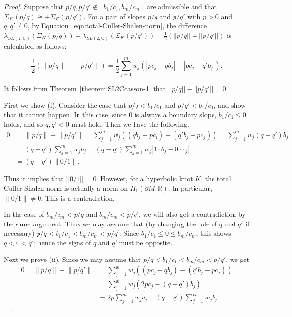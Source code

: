 \documentclass{amsart}
\theoremstyle{remark}
\theoremstyle{definition}
\begin{document}
\begin{proof}
Suppose that $p/q, p/q' \not\in [ b_1 / c_1 , b_m / c_m ]$ are admissible and that  $\Sigma_K (p/q) \cong \pm \Sigma_K (p/q')$. 
For a pair of slopes $p/q$ and $p/q'$ with $p > 0$ and $q, q' \neq 0$, by Equation~\eqref{eqn:total-Culler-Shalen-norm}, the difference $\lambda_{SL(2,\mathbb{C})} (\Sigma_K(p/q) ) - \lambda_{SL(2,\mathbb{C})} (\Sigma_K(p/q') ) = \frac{1}{2}\left(||p/q||-||p/q'||\right)$ is calculated as follows: 

\begin{equation}\label{eq1}
\frac{1}{2} \left( \left\| p/q \right\| - \left\| p /q'  \right\| \right) 
=\frac{1}{2} \sum_{j=1}^{m} w_j \left( \left| p c_j - q b_j \right| - \left| p c_j -  q' b_j \right| \right) .
\end{equation}

It follows from Theorem~\ref{theorem:SL2Ccasson-1} that $||p/q||-|| p/q'||=0$. 

First we show (i). 
Consider the case that $p/q < b_1 / c_1$ and $p/q' < b_1 / c_1$, and show that it cannot happen. 
In this case, since $0$ is always a boundary slope, $b_1 / c_1\leq 0$ holds, and so $q,q'<0$ must hold. 
Then we have the following. 
\begin{align*}
0 &= \left\| p/q \right\| - \left\| p/q' \right\| =\sum_{j=1}^{m} w_j ( ( q b_j - p c_j ) - ( q' b_j - p c_j ) )=\sum_{j=1}^{m} w_j ( q - q' ) b_j \\
&=(q-q')  \sum_{j=1}^{m} w_j b_j =(q-q')  \sum_{j=1}^{m}w_j|1 \cdot b_j- 0 \cdot c_j|\\
& = (q-q') \left\| 0/1 \right\|. 
\end{align*}

Thus it implies that $||0/1||=0$. 
However, for a hyperbolic knot $K$, the total Culler-Shalen norm is actually a norm on $H_1 (\partial M ; \mathbb{R})$. 
In particular, $\| 0/1 \| \ne 0$. This is a contradiction. 

In the case of $b_m / c_m < p/q$ and $b_m /c_m < p/q'$, we will also get a contradiction by the same argument. 
Thus we may assume that (by changing the role of $q$ and $q'$ if necessary) $p/q < b_1 / c_1 < b_m / c_m < p/q'$. 
Since $b_1 / c_1 \leq 0 \leq  b_m / c_m$, this shows $q<0<q'$; hence the signs of $q$ and $q'$ must be opposite. 

Next we prove (ii). 
Since we may assume that $p/q < b_1 / c_1 < b_m / c_m < p/q'$, we get
\begin{align*}
0=  \left\| p/q \right\| - \left\| p/q' \right\| 
&=\sum_{j=1}^{m}w_j ( ( p c_j  - q b_j ) - ( q' b_j - p c_j ) )\\
&=\sum_{j=1}^{m} w_j (  2 p c_j - ( q + q' ) b_j ) \\
&= 2p\sum_{j=1}^{m}w_j c_j   -(q + q')\sum_{j=1}^{m} w_j b_j  \;.
\end{align*}


\end{proof}
\end{document}
